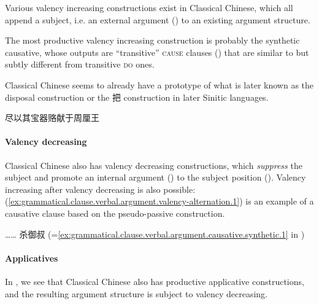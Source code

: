 \documentclass[UTF8, a4paper, oneside, scheme=plain, 12pt]{ctexrep}
\newcommand*{\category}[1]{\textsc{#1}}
\begin{document}
Various valency increasing constructions exist in Classical Chinese,
which all append a subject, i.e. an external argument () to an existing argument structure.

The most productive valency increasing construction is probably the synthetic causative,
whose outputs are ``transitive'' \category{cause} clauses
()
that are similar to but subtly different from transitive \category{do} ones.

Classical Chinese seems to already have a prototype of what is later known as the disposal construction or the 把 construction in later Sinitic languages.

\begin{exe}
    \ex 尽以其宝器赂献于周厘王
\end{exe}

\paragraph{Valency decreasing}

Classical Chinese also has valency decreasing constructions, which \emph{suppress} the subject 
and promote an internal argument () to the subject position ().
Valency increasing after valency decreasing is also possible:
(\ref{ex:grammatical.clause.verbal.argument.valency-alternation.1})
is an example of a causative clause based on the pseudo-passive construction.

\begin{exe}
    \ex\label{ex:grammatical.clause.verbal.argument.valency-alternation.1} …… 杀御叔 (=\ref{ex:grammatical.clause.verbal.argument.causative.synthetic.1} in )
\end{exe}

\paragraph{Applicatives}

In ,
we see that Classical Chinese also has productive applicative constructions,
and the resulting argument structure is subject to valency decreasing.
\end{document}
